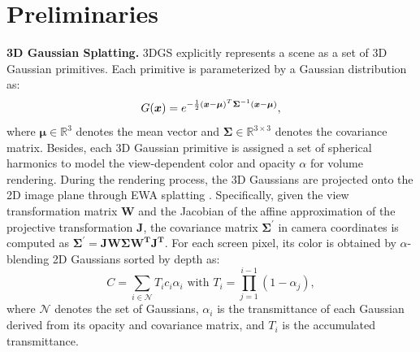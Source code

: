 \documentclass{article} %
\begin{document}
\section{Preliminaries}
\textbf{3D Gaussian Splatting.} 3DGS \citep{3dgs} explicitly represents a scene as a set of 3D Gaussian primitives. Each primitive is parameterized by a Gaussian distribution as:
\begin{equation}
    G({\bm{x}})=e^{-\frac{1}{2}(\boldsymbol{x}-\boldsymbol{\mu})^T \boldsymbol{\Sigma}^{-1}(\boldsymbol{x}-\boldsymbol{\mu})},
\end{equation}
where $\boldsymbol{\mu} \in \mathbb{R}^{3}$ denotes the mean vector and $\boldsymbol{\Sigma} \in \mathbb{R}^{3\times 3}$ denotes the covariance matrix. Besides, each 3D Gaussian primitive is assigned a set of spherical harmonics  to model the view-dependent color and opacity $\alpha$ for volume rendering. During the rendering process, the 3D Gaussians are projected onto the 2D image plane through EWA splatting \citep{zwicker2001ewa}. Specifically, given the view transformation matrix $\bm{W}$ and the Jacobian of the affine approximation of the projective transformation $\bm{J}$, the covariance matrix $\boldsymbol{\Sigma}^{\prime}$ in camera coordinates is computed as $\boldsymbol{\Sigma}^{\prime}=\boldsymbol{J} \boldsymbol{W} \boldsymbol{\Sigma} \boldsymbol{W^T} \boldsymbol{J^T}$.
For each screen pixel, its color is obtained by $\alpha$-blending 2D Gaussians sorted by depth as:
\begin{equation}
    C=\sum_{i \in \mathcal{N}} T_i c_i \alpha_i  \text { with } T_i=\prod_{j=1}^{i-1}\left(1-\alpha_j\right),
\end{equation}
where $\mathcal{N}$ denotes the set of Gaussians, $\alpha_i$ is the transmittance of each Gaussian derived from its opacity and covariance matrix, and $T_i$ is the accumulated transmittance.
\end{document}
